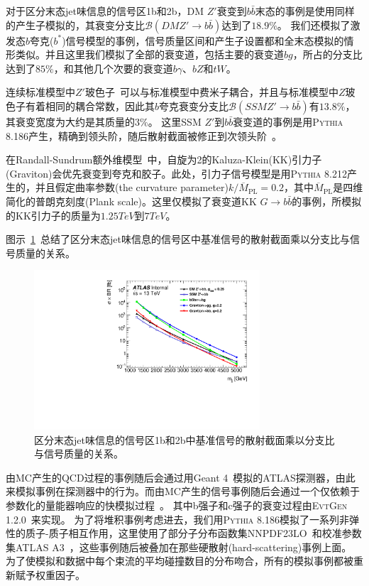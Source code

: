 对于区分末态jet味信息的信号区1b和2b，DM $Z\prime$衰变到$b\bar{b}$末态的事例是使用同样的产生子模拟的，其衰变分支比$\mathcal{B}(DM Z\prime \to b\bar{b})$达到了$18.9\%$。
我们还模拟了激发态$b$夸克($b^*$)信号模型的事例，信号质量区间和产生子设置都和全末态模拟的情形类似。并且这里我们模拟了全部的衰变道，包括主要的衰变道$bg$，所占的分支比达到了$85\%$，和其他几个次要的衰变道$b\gamma$、$bZ$和$tW$。

连续标准模型中$Z\prime$玻色子~\cite{zprime1}可以与标准模型中费米子耦合，并且与标准模型中$Z$玻色子有着相同的耦合常数，因此其$b$夸克衰变分支比$\mathcal{B}(SSM Z\prime \to b\bar{b})$有$13.8\%$，其衰变宽度为大约是其质量的$3\%$。
这里SSM $Z\prime$到$b\bar{b}$衰变道的事例是用\textsc{Pythia 8.186}产生，精确到领头阶，随后散射截面被修正到次领头阶~\cite{Alwall:2014hca}。

在Randall-Sundrum额外维模型~\cite{RS1,RS2}中，自旋为2的Kaluza-Klein(KK)引力子(Graviton)会优先衰变到夸克和胶子。此处，引力子信号模型是用\textsc{Pythia 8.212}产生的，并且假定曲率参数(the curvature parameter)$k/\overline{M}_\text{PL}=0.2$，其中$\overline{M}_\text{PL}$是四维简化的普朗克刻度(Plank scale)。这里仅模拟了衰变道KK $G \rightarrow b\bar{b}$的事例，所模拟的KK引力子的质量为$1.25TeV$到$7TeV$。

图示~\ref{fig:Data3}~总结了区分末态jet味信息的信号区中基准信号的散射截面乘以分支比与信号质量的关系。

\begin{figure}[thbp]
  \centering
  \includegraphics[width=0.75\textwidth]{figuresDijet/03-BenchmarkSignals/taggedSignal_xs.pdf}
  \caption{ 区分末态jet味信息的信号区1b和2b中基准信号的散射截面乘以分支比与信号质量的关系。 }
  \label{fig:Data3}
\end{figure}

由MC产生的QCD过程的事例随后会通过用Geant 4~\cite{Agostinelli:2002hh}模拟的ATLAS探测器，由此来模拟事例在探测器中的行为。而由MC产生的信号事例随后会通过一个仅依赖于参数化的量能器响应的快模拟过程~\cite{ATL-PHYS-PUB-2010-013}。
其中b强子和c强子的衰变过程由\textsc{EvtGen 1.2.0}~\cite{Lange:2001uf}来实现。
为了将堆积事例考虑进去，我们用\textsc{Pythia 8.186}模拟了一系列非弹性的质子-质子相互作用，这里使用了部分子分布函数集NNPDF23LO~\cite{Martin:2009iq}和校准参数集ATLAS A3~\cite{ATL-PHYS-PUB-2016-017}，这些事例随后被叠加在那些硬散射(hard-scattering)事例上面。
为了使模拟和数据中每个束流的平均碰撞数目的分布吻合，所有的模拟事例都被重新赋予权重因子。




